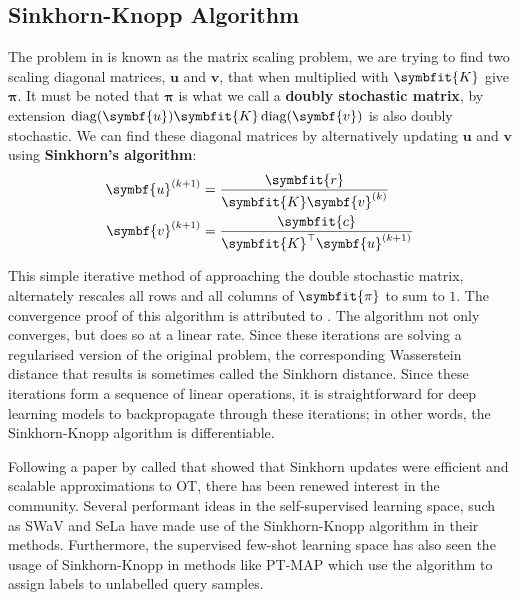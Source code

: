 \subsection{Sinkhorn-Knopp Algorithm}\label{ssec:ot-sk}
The problem in  is known as the matrix scaling problem, we are trying to find two scaling diagonal matrices, $\symbf{u}$ and $\symbf{v}$, that when multiplied with $\symbfit{K}$ give $\symbf{\pi}$. It must be noted that $\symbf{\pi}$ is what we call a \textbf{doubly stochastic matrix}, by extension $\operatorname{diag}(\symbf{u}) \symbfit{K} \operatorname{diag}(\symbf{v})$ is also doubly stochastic.
We can find these diagonal matrices by alternatively updating $\symbf{u}$ and $\symbf{v}$ using \textbf{Sinkhorn's algorithm}:
\begin{align}
\symbf{u}^{(k+1)} &= \frac{\symbfit{r}}{\symbfit{K}\symbf{v}^{(k)}}\\
\symbf{v}^{(k+1)} &= \frac{\symbfit{c}}{\symbfit{K}^{\top}\symbf{u}^{(k+1)}}
\end{align}

This simple iterative method of approaching the double stochastic matrix, alternately rescales all rows and all columns of $\symbfit{\pi}$ to sum to $1$. The convergence proof of this algorithm is attributed to \textcite{Sinkhorn1967}. The algorithm not only converges, but does so at a linear rate. Since these iterations are solving a regularised version of the original problem, the corresponding Wasserstein distance that results is sometimes called the Sinkhorn distance. Since these iterations form a sequence of linear operations, it is straightforward for deep learning models to backpropagate through these iterations; in other words, the Sinkhorn-Knopp algorithm is differentiable.

Following a paper by \textcite{cuturi2013sinkhorn} called  that showed that Sinkhorn updates were efficient and scalable approximations to OT, there has been renewed interest in the community.
Several performant ideas in the self-supervised learning space, such as SWaV \parencite{caron2020unsupervised} and SeLa \parencite{asano2019self} have made use of the Sinkhorn-Knopp algorithm in their methods. Furthermore, the supervised few-shot learning space has also seen the usage of Sinkhorn-Knopp in methods like PT-MAP \parencite{hu2021leveraging} which use the algorithm to assign labels to unlabelled query samples.


